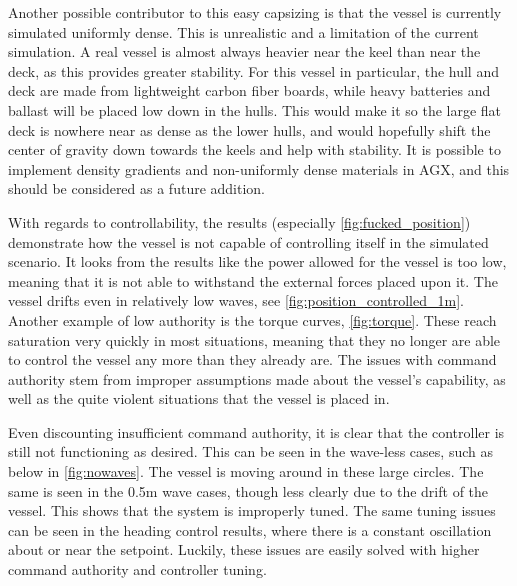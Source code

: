 \documentclass[class=article, crop=false]{standalone}
\begin{document}
Another possible contributor to this easy capsizing is that the vessel is currently simulated uniformly dense. This is unrealistic and a limitation of the current simulation. A real vessel is almost always heavier near the keel than near the deck, as this provides greater stability. For this vessel in particular, the hull and deck are made from lightweight carbon fiber boards, while heavy batteries and ballast will be placed low down in the hulls. This would make it so the large flat deck is nowhere near as dense as the lower hulls, and would hopefully shift the center of gravity down towards the keels and help with stability. It is possible to implement density gradients and non-uniformly dense materials in AGX, and this should be considered as a future addition.

With regards to controllability, the results (especially \cref{fig:fucked_position}) demonstrate how the vessel is not capable of controlling itself in the simulated scenario. It looks from the results like the power allowed for the vessel is too low, meaning that it is not able to withstand the external forces placed upon it. The vessel drifts even in relatively low waves, see \cref{fig:position_controlled_1m}. Another example of low authority is the torque curves, \cref{fig:torque}. These reach saturation very quickly in most situations, meaning that they no longer are able to control the vessel any more than they already are. The issues with command authority stem from improper assumptions made about the vessel's capability, as well as the quite violent situations that the vessel is placed in.

Even discounting insufficient command authority, it is clear that the controller is still not functioning as desired. This can be seen in the wave-less cases, such as below in \cref{fig:nowaves}. The vessel is moving around in these large circles. The same is seen in the 0.5m wave cases, though less clearly due to the drift of the vessel. This shows that the system is improperly tuned. The same tuning issues can be seen in the heading control results, where there is a constant oscillation about or near the setpoint. Luckily, these issues are easily solved with higher command authority and controller tuning.
\end{document}
